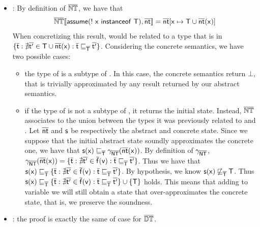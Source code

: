\documentclass{llncs}
\begin{document}
\begin{lemma}
\begin{itemize}
\item {}: By definition of $\overline{\mathit{\mathbb{NT}}}$, we have that 
\[
\asemanticsnottyping{\statement{assume(!\ x\ instanceof\ T)}, \ael{nt}}=\ael{nt}[\statement{x} \mapsto \statement{T} \cup \ael{nt}(\statement{x})]
\]
When concretizing this result,  would be related to a type that is in $\{\mathsf{\overline{t}} : \nexists \mathsf{\overline{t'}} \in \mathsf{T} \cup \mathsf{\overline{nt}}(\mathsf{x}) : \mathsf{\overline{t}} \sqsubseteq_{\mathsf{\overline{T}}} \mathsf{\overline{t'}} \}$. Considering the concrete semantics, we have two possible cases:
\begin{itemize}
\item the type of  is a subtype of . In this case, the concrete semantics return $\bot$, that is trivially approximated by any result returned by our abstract semantics.
\item if the type of  is not a subtype of , it returns the initial state. Instead, $\overline{\mathit{\mathbb{NT}}}$ associates  to the union between the types it was previously related to and . Let $\mathsf{\overline{nt}}$ and $\mathsf{s}$ be respectively the abstract and concrete state. Since we suppose that the initial abstract state soundly approximates the concrete one, we have that $\mathsf{s}(\mathsf{x}) \sqsubseteq_{\mathsf{\overline{T}}} \gamma_{\mathsf{\overline{NT}}}(\mathsf{\overline{nt}}(\mathsf{x}))$. By definition of $\gamma_{\mathsf{\overline{NT}}}$, $\gamma_{\mathsf{\overline{NT}}}(\mathsf{\overline{nt}}(\mathsf{x}))=\{\mathsf{\overline{t}} : \nexists \mathsf{\overline{t'}} \in \mathsf{\overline{f}}(\mathsf{v}) : \mathsf{\overline{t}} \sqsubseteq_{\mathsf{\overline{T}}} \mathsf{\overline{t'}}\}$. Thus we have that $\mathsf{s}(\mathsf{x}) \sqsubseteq_{\mathsf{\overline{T}}} \{\mathsf{\overline{t}} : \nexists \mathsf{\overline{t'}} \in \mathsf{\overline{f}}(\mathsf{v}) : \mathsf{\overline{t}} \sqsubseteq_{\mathsf{\overline{T}}} \mathsf{\overline{t'}}\}$. By hypothesis, we know $\mathsf{s}(\mathsf{x}) \not \sqsubseteq_{\mathsf{\overline{T}}} \mathsf{T}$. Thus $\mathsf{s}(\mathsf{x}) \sqsubseteq_{\mathsf{\overline{T}}} \{\mathsf{\overline{t}} : \nexists \mathsf{\overline{t'}} \in \mathsf{\overline{f}}(\mathsf{v}) : \mathsf{\overline{t}} \sqsubseteq_{\mathsf{\overline{T}}} \mathsf{\overline{t'}}\} \cup \{\mathsf{T}\}$ holds. This means that adding  to variable  we will still obtain a state that over-approximates the concrete state, that is, we preserve the soundness.
\end{itemize}
\item {}: the proof is exactly the same of case  for $\overline{\mathit{\mathbb{DT}}}$.
\end{itemize}
\end{lemma}
\end{document}
